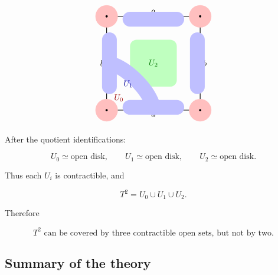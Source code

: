 \documentclass[12pt,a4paper]{article}
\theoremstyle{notespace}
\begin{document}
\[
\begin{tikzpicture}[scale=4, line cap=round, line join=round]
	
	\draw[thick] (0,0) rectangle (1,1);
	
	\draw[->, thick] (0.22,0) -- (0.78,0);
	\node[below] at (0.5,0) {$a$};
	
	\draw[->, thick] (0.78,1) -- (0.22,1);
	\node[above] at (0.5,1) {$a$};
	
	\draw[->, thick] (0,0.22) -- (0,0.78);
	\node[left] at (0,0.5) {$b$};
	
	\draw[->, thick] (1,0.78) -- (1,0.22);
	\node[right] at (1,0.5) {$b$};
	
	\fill[green!25, rounded corners=8pt] (0.25,0.25) rectangle (0.75,0.75);
	\node[green!45!black, font=\bfseries] at (0.5,0.5) {$U_2$};
	
	\draw[blue!25, line width=18pt] (0.25,0.03) -- (0.75,0.03);
	\draw[blue!25, line width=18pt] (0.25,0.97) -- (0.75,0.97);
	\draw[blue!25, line width=18pt] (0.03,0.25) -- (0.03,0.75);
	\draw[blue!25, line width=18pt] (0.97,0.25) -- (0.97,0.75);
	\draw[blue!25, line width=18pt] (0.5,0.03)
	.. controls (0.45,0.22) and (0.22,0.45) ..
	(0.03,0.5);
	
	\node[blue!60!black, font=\bfseries] at (0.23,0.28) {$U_1$};
	
	\foreach \x/\y in {0/0,1/0,0/1,1/1}
	{
		\fill[red!25] (\x,\y) circle (0.12);
	}
	
	\node[red!60!black, font=\bfseries] at (0.13,0.13) {$U_0$};
	
	\foreach \x/\y in {0/0,1/0,0/1,1/1}
	{
		\fill (\x,\y) circle (0.012);
	}
	
\end{tikzpicture}
\]

After the quotient identifications:

\[
U_0\simeq \text{open disk},
\qquad
U_1\simeq \text{open disk},
\qquad
U_2\simeq \text{open disk}.
\]

Thus each \(U_i\) is contractible, and

\[
T^2=U_0\cup U_1\cup U_2.
\]

Therefore

\[
\boxed{
	T^2\text{ can be covered by three contractible open sets, but not by two.}
}
\]

\subsection{Summary of the theory}
\end{document}

